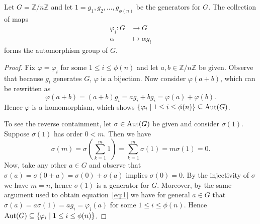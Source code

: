 \documentclass[10pt]{amsart}
\begin{document}
\begin{lem}\label{lemma:aut}
  Let $G= \mathbb{Z}/n\mathbb{Z}$ and let $1 = g_1, g_2, \ldots, g_{\phi(n)}$ be the generators for $G$.
  The collection of maps 
  \begin{align*}
    \varphi_i \colon G &\rightarrow G\\
    \alpha &\mapsto \alpha g_i
  \end{align*}
  forms the automorphism group of $G$.
  \begin{proof}
    Fix $\varphi = \varphi_i$ for some $1 \leq i \leq \phi(n)$ and let $a,b \in \mathbb{Z}/n\mathbb{Z}$ be given.
    Observe that because $g_i$ generates $G$, $\varphi$ is a bijection.
    Now consider $\varphi(a+b)$, which can be rewritten as $$\varphi(a+b) = (a+b)g_i = ag_i + bg_i = \varphi(a) + \varphi(b).$$
    Hence $\varphi$ is a homomorphism, which shows $\left\{\varphi_i \mid 1 \leq i \leq \phi(n)\right\} \subseteq \operatorname{Aut}(G)$.
    
    To see the reverse containment, let $\sigma \in \operatorname{Aut}(G)$ be given and consider $\sigma(1)$.
    Suppose $\sigma(1)$ has order $0 < m$.
    Then we have 
    \begin{equation}\label{eq:1}
      \sigma(m) = \sigma\left(\sum_{k=1}^m 1\right) = \sum_{k=1}^m\sigma(1) = m\sigma(1) = 0.
    \end{equation}
    Now, take any other $a \in G$ and observe that $\sigma(a) = \sigma(0 + a) = \sigma(0) + \sigma(a)$ implies $\sigma(0) = 0$.
    By the injectivity of $\sigma$ we have $m = n$, hence $\sigma(1)$ is a generator for $G$.
    Moreover, by the same argument used to obtain equation~\ref{eq:1} we have for general $a \in G$ that $\sigma(a) = a\sigma(1) = ag_i = \varphi_i(a)$ for some $1 \leq i \leq \phi(n)$.
    Hence $\operatorname{Aut}(G) \subseteq  \left\{\varphi_i \mid 1 \leq i \leq \phi(n)\right\}$.
  \end{proof}
\end{lem}
\end{document}
